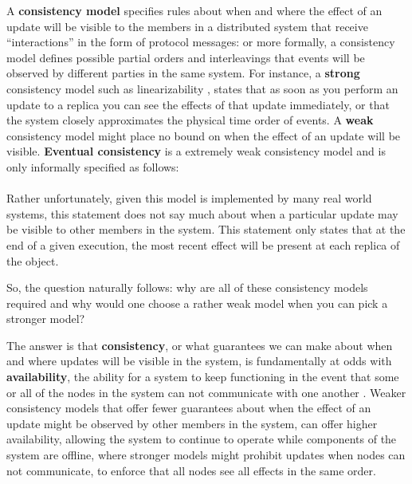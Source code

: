 \documentclass[english]{article}
\begin{document}
A \textbf{consistency model} specifies rules about when and where the effect of an update will be visible to the members in a distributed system that receive ``interactions'' in the form of protocol messages: or more formally, a consistency model defines possible partial orders and interleavings that events will be observed by different parties in the same system.  For instance, a \textbf{strong} consistency model such as linearizability \cite{herlihy1990linearizability}, states that as soon as you perform an update to a replica you can see the effects of that update immediately, or that the system closely approximates the physical time order of events.  A \textbf{weak} consistency model might place no bound on when the effect of an update will be visible.  \textbf{Eventual consistency} is a extremely weak consistency model and is only informally specified as follows:
\\

 \cite{vogels2009eventually}
\\

Rather unfortunately, given this model is implemented by many real world systems, this statement does not say much about when a particular update may be visible to other members in the system.  This statement only states that at the end of a given execution, the most recent effect will be present at each replica of the object.

So, the question naturally follows: why are all of these consistency models required and why would one choose a rather weak model when you can pick a stronger model?

The answer is that \textbf{consistency}, or what guarantees we can make about when and where updates will be visible in the system, is fundamentally at odds with \textbf{availability}, the ability for a system to keep functioning in the event that some or all of the nodes in the system can not communicate with one another \cite{gilbert2002brewer}.  Weaker consistency models that offer fewer guarantees about when the effect of an update might be observed by other members in the system, can offer higher availability, allowing the system to continue to operate while components of the system are offline, where stronger models might prohibit updates when nodes can not communicate, to enforce that all nodes see all effects in the same order.
\end{document}
